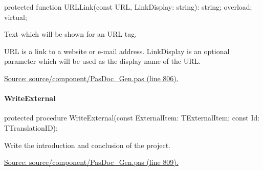 \documentclass{report}
\newif\ifpdf
\begin{document}
\label{PasDoc_Gen.TDocGenerator-URLLink}
\begin{list}{}{
\setlength{\itemindent}{0cm}
\setlength{\listparindent}{0cm}
\setlength{\leftmargin}{\evensidemargin}
\addtolength{\leftmargin}{\tmplength}
\settowidth{\labelsep}{X}
\addtolength{\leftmargin}{\labelsep}
\setlength{\labelwidth}{\tmplength}
}
\item[\textbf{Declaration}\hfill]
\ifpdf
\begin{flushleft}
\fi
\begin{ttfamily}
protected function URLLink(const URL, LinkDisplay: string): string; overload; virtual;\end{ttfamily}

\ifpdf
\end{flushleft}
\fi

\par
\item[\textbf{Description}]
Text which will be shown for an URL tag.

URL is a link to a website or e{-}mail address. LinkDisplay is an optional parameter which will be used as the display name of the URL.\par
\href{https://github.com/pasdoc/pasdoc/blob/master/source/component/PasDoc_Gen.pas#L806}{Source: source/component/PasDoc{\_}Gen.pas (line 806).}

\end{list}
\paragraph*{WriteExternal}\hspace*{\fill}

\label{PasDoc_Gen.TDocGenerator-WriteExternal}
\begin{list}{}{
\setlength{\itemindent}{0cm}
\setlength{\listparindent}{0cm}
\setlength{\leftmargin}{\evensidemargin}
\addtolength{\leftmargin}{\tmplength}
\settowidth{\labelsep}{X}
\addtolength{\leftmargin}{\labelsep}
\setlength{\labelwidth}{\tmplength}
}
\item[\textbf{Declaration}\hfill]
\ifpdf
\begin{flushleft}
\fi
\begin{ttfamily}
protected procedure WriteExternal(const ExternalItem: TExternalItem; const Id: TTranslationID);\end{ttfamily}

\ifpdf
\end{flushleft}
\fi

\par
\item[\textbf{Description}]
Write the introduction and conclusion of the project.\par
\href{https://github.com/pasdoc/pasdoc/blob/master/source/component/PasDoc_Gen.pas#L809}{Source: source/component/PasDoc{\_}Gen.pas (line 809).}

\end{list}
\end{document}
